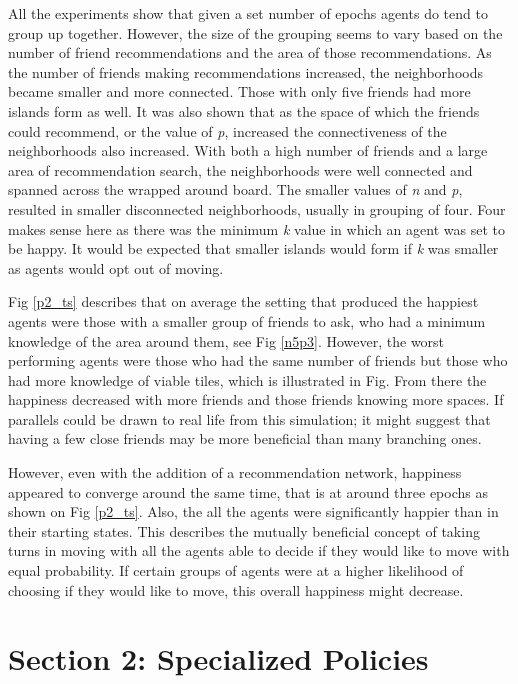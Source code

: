 \documentclass[11pt]{article}
\begin{document}
	All the experiments show that given a set number of epochs agents do tend to group up together. However, the size of the grouping seems to vary based on the number of friend recommendations and the area of those recommendations. As the number of friends making recommendations increased, the neighborhoods became smaller and more connected. Those with only five friends had more islands form as well. It was also shown that as the space of which the friends could recommend, or the value of \textit{p}, increased the connectiveness of the neighborhoods also increased. With both a high number of friends and a large area of recommendation search, the neighborhoods were well connected and spanned across the wrapped around board. The smaller values of \textit{n} and \textit{p}, resulted in smaller disconnected neighborhoods, usually in grouping of four. Four makes sense here as there was the minimum \textit{k} value in which an agent was set to be happy. It would be expected that smaller islands would form if \textit{k} was smaller as agents would opt out of moving. \par
	Fig \ref{p2_ts} describes that on average the setting that produced the happiest agents were those with a smaller group of friends to ask, who had a minimum knowledge of the area around them, see Fig \ref{n5p3}. However, the worst performing agents were those who had the same number of friends but those who had more knowledge of viable tiles, which is illustrated in Fig. From there the happiness decreased with more friends and those friends knowing more spaces. If parallels could be drawn to real life from this simulation; it might suggest that having a few close friends may be more beneficial than many branching ones. \par
	However, even with the addition of a recommendation network, happiness appeared to converge around the same time, that is at around three epochs as shown on Fig \ref{p2_ts}. Also, the all the agents were significantly happier than in their starting states. This describes the mutually beneficial concept of taking turns in moving with all the agents able to decide if they would like to move with equal probability. If certain groups of agents were at a higher likelihood of choosing if they would like to move, this overall happiness might decrease. 
	


	\newpage
	\section{Section 2: Specialized Policies}
\end{document}
